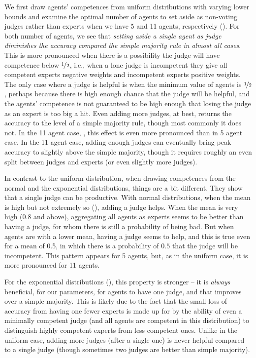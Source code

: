 \documentclass[letterpaper]{article} %
\begin{document}
We first draw agents' competences from uniform distributions with varying lower bounds and examine the optimal number of agents to set aside as non-voting judges rather than experts when we have 5 and 11 agents, respectively (). For both number of agents, we see that \emph{setting aside a single agent as judge diminishes the accuracy compared the simple majority rule in almost all cases}. This is more pronounced when there is a possibility the judge will have competence below $\nicefrac{1}{2}$, i.e., when a lone judge is incompetent they give all competent experts negative weights and incompetent experts positive weights. The only case where a judge is helpful is when the minimum value of agents is $\nicefrac{1}{2}$, perhaps because there is high enough chance that the judge will be helpful, and the agents' competence is not guaranteed to be high enough that losing the judge as an expert is too big a hit. Even adding more judges, at best, returns the accuracy to the level of a simple majority rule, though most commonly it does not. In the 11 agent case, , this effect is even more pronounced than in 5 agent case. In the 11 agent case, adding enough judges can eventually bring peak accuracy to slightly above the simple majority, though it requires roughly an even split between judges and experts (or even slightly more judges).

In contrast to the uniform distribution, when drawing competences from the normal  and the exponential distributions, things are a bit different. They show that a single judge can be productive. With normal distributions, when the mean is high but not extremely so (), adding a judge helps. When the mean is very high (0.8 and above), aggregating all agents as experts seems to be better than having a judge, for whom there is still a probability of being bad. But when agents are with a lower mean, having a judge seems to help, and this is true even for a mean of 0.5, in which there is a probability of $0.5$ that the judge will be incompetent. This pattern appears for 5 agents, but, as in the uniform case, it is more pronounced for 11 agents.

For the exponential distributions (), this property is stronger -- it is \emph{always} beneficial, for our parameters, for agents to have one judge, and that improves over a simple majority. This is likely due to the fact that the small loss of accuracy from having one fewer experts is made up for by the ability of even a minimally competent judge (and all agents are competent in this distribution) to distinguish highly competent experts from less competent ones. Unlike in the uniform case, adding more judges (after a single one) is never helpful compared to a single judge (though sometimes two judges are better than simple majority).
\end{document}
